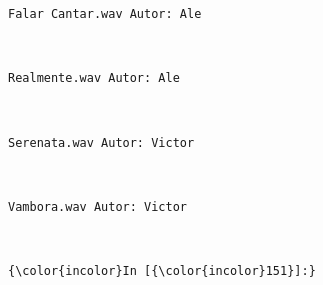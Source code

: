 \documentclass[11pt]{article}
\begin{document}
    \begin{Verbatim}[commandchars=\\\{\}]
Falar Cantar.wav Autor: Ale

    \end{Verbatim}

    \begin{center}
    \end{center}
    { \hspace*{\fill} \\}
    
    \begin{Verbatim}[commandchars=\\\{\}]
Realmente.wav Autor: Ale

    \end{Verbatim}

    \begin{center}
    \end{center}
    { \hspace*{\fill} \\}
    
    \begin{Verbatim}[commandchars=\\\{\}]
Serenata.wav Autor: Victor

    \end{Verbatim}

    \begin{center}
    \end{center}
    { \hspace*{\fill} \\}
    
    \begin{Verbatim}[commandchars=\\\{\}]
Vambora.wav Autor: Victor

    \end{Verbatim}

    \begin{center}
    \end{center}
    { \hspace*{\fill} \\}
    
    \begin{Verbatim}[commandchars=\\\{\}]
{\color{incolor}In [{\color{incolor}151}]:} 
\end{Verbatim}
\end{document}
